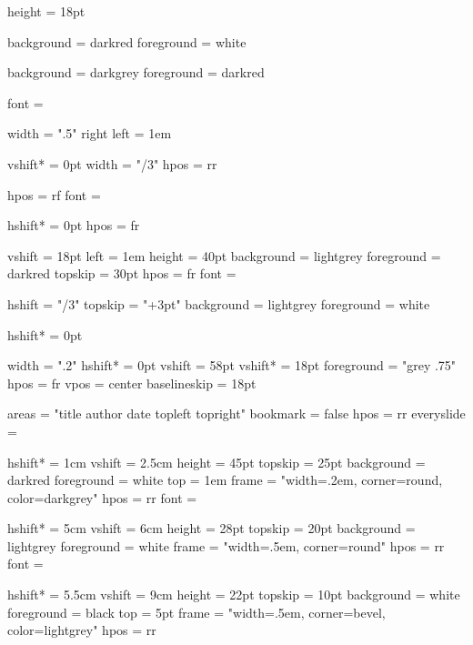   height = 18pt

  background = darkred
  foreground = white
  
  background = darkgrey
  foreground = darkred

  font = \subtitlefont

  width      = ".5\pdfpagewidth"
  right left = 1em

  vshift* = 0pt
  width   = "\pdfpagewidth/3"
  hpos    = rr

  hpos       = rf
  font       = \titlefont

  hshift* = 0pt
  hpos    = fr
    
  vshift     = 18pt
  left       = 1em
  height     = 40pt
  background = lightgrey
  foreground = darkred
  topskip    = 30pt
  hpos       = fr
  font       = \slidetitlefont

  
  hshift     = "\pdfpagewidth/3"
  topskip    = "\symbolheight\buttonborder+3pt"
  background = lightgrey
  foreground = white
  
  hshift* = 0pt

%
%
  width      = ".2\pdfpagewidth"
  hshift*    = 0pt
  vshift     = 58pt
  vshift*    = 18pt
  foreground = "grey .75"
  hpos       = fr
  vpos       = center
  baselineskip = 18pt


%
%
  areas      = "title author date topleft topright"
  bookmark   = false
  hpos       = rr
  everyslide = {}

  hshift*    = 1cm
  vshift     = 2.5cm
  height     = 45pt
  topskip    = 25pt
  background = darkred
  foreground = white
  top        = 1em
  frame      = "width=.2em, corner=round, color=darkgrey"
  hpos       = rr
  font       = \maintitlefont

  hshift*    = 5cm
  vshift     = 6cm
  height     = 28pt
  topskip    = 20pt
  background = lightgrey
  foreground = white
  frame      = "width=.5em, corner=round"
  hpos       = rr
  font       = \slidetitlefont
  
  hshift*    = 5.5cm
  vshift     = 9cm
  height     = 22pt
  topskip    = 10pt
  background = white
  foreground = black
  top        = 5pt
  frame      = "width=.5em, corner=bevel, color=lightgrey"
  hpos       = rr


